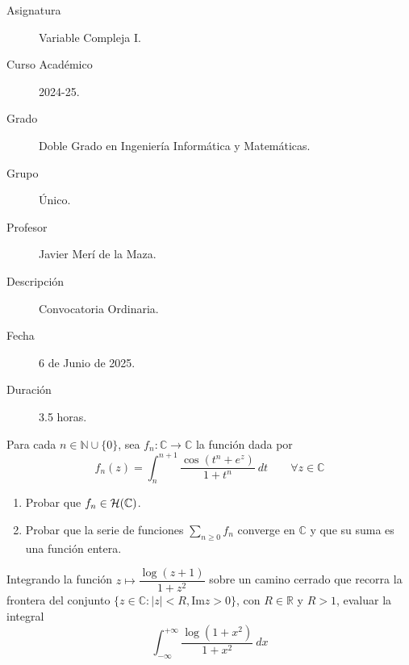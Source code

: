\documentclass[12pt]{article}
\begin{document}

    
    

    \begin{description}
        \item[Asignatura] Variable Compleja I.
        \item[Curso Académico] 2024-25.
        \item[Grado] Doble Grado en Ingeniería Informática y Matemáticas.
        \item[Grupo] Único.
        \item[Profesor] Javier Merí de la Maza.
        \item[Descripción] Convocatoria Ordinaria.
        \item[Fecha] 6 de Junio de 2025.
        \item[Duración] 3.5 horas.
    \end{description}
    \newpage

    \begin{ejercicio}[2.5 puntos]
        Para cada $n\in \mathbb{N}\cup \{0\}$, sea $f_n:\mathbb{C}\to\mathbb{C}$ la función dada por
        \begin{equation*}
            f_n(z) = \int_{n}^{n+1} \dfrac{\cos(t^n+e^z)}{1+t^n}~dt  \qquad \forall z\in \mathbb{C}
        \end{equation*}
        \begin{enumerate}[label=\alph*)]
            \item Probar que $f_n\in \mathcal{H}(\mathbb{C})$.
            \item Probar que la serie de funciones $\sum\limits_{n\geq 0} f_n$ converge en $\mathbb{C}$ y que su suma es una función entera.
        \end{enumerate}
    \end{ejercicio}

    \begin{ejercicio}[2.5 puntos]
        Integrando la función $z\longmapsto \dfrac{\log(z+1)}{1+z^2}$ sobre un camino cerrado que recorra la frontera del conjunto $\{z\in \mathbb{C} : |z| < R, \text{Im}z > 0\}$, con $R\in \mathbb{R}$ y $R>1$, evaluar la integral
        \begin{equation*}
            \int_{-\infty}^{+\infty} \dfrac{\log(1+x^2)}{1+x^2}~dx 
        \end{equation*}
    \end{ejercicio}
\end{document}

